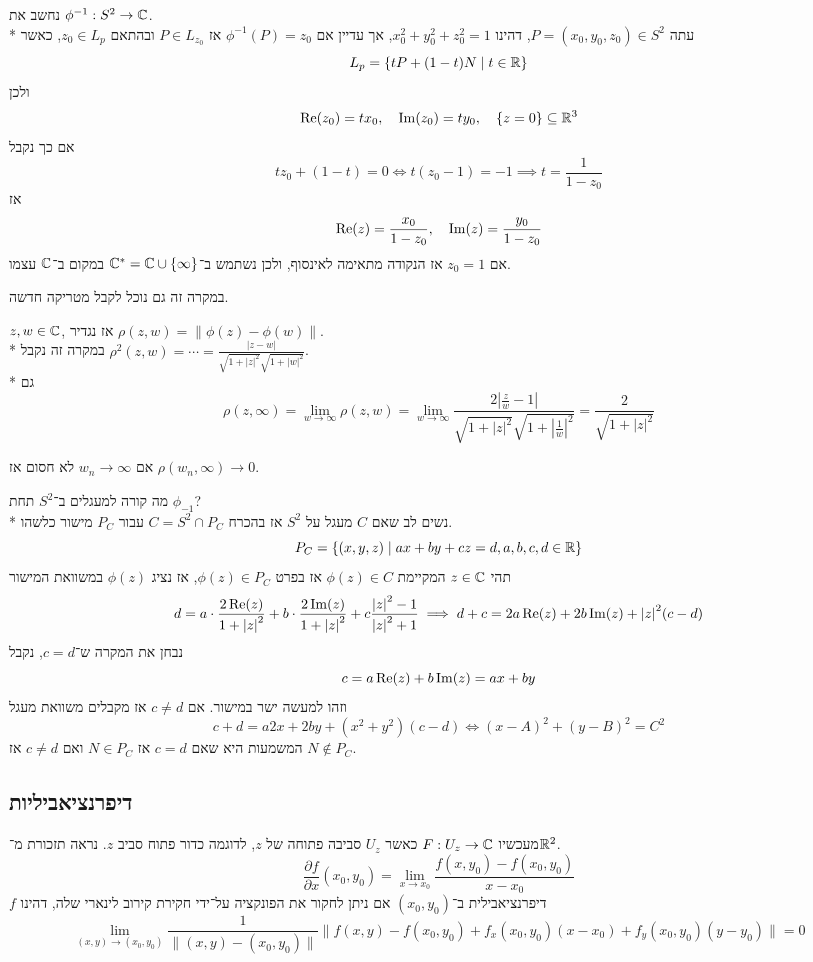 נחשב את $\phi^{-1} : S^2 \to \mathbb{C}$. \\*
עתה $P = (x_0, y_0, z_0) \in S^2$, דהינו $x_0^2 + y_0^2 + z_0^2 = 1$, אך עדיין אם $\phi^{-1}(P) = z_0$ אז $P \in L_{z_0}$ ובהתאם $z_0 \in L_p$, כאשר
\[
	L_p = \{ t P + (1 - t) N \mid t \in \mathbb{R} \}
\]
ולכן
\[
	\operatorname{Re}(z_0) = t x_0,
	\quad \operatorname{Im}(z_0) = t y_0,
	\quad \{ z = 0 \} \subseteq \mathbb{R}^3
\]
אם כך נקבל
\[
	t z_0 + (1 - t) = 0 \iff t(z_0 - 1) = -1 \implies t = \frac{1}{1 - z_0}
\]
אז
\[
	\operatorname{Re}(z) = \frac{x_0}{1 - z_0},
	\quad \operatorname{Im}(z) = \frac{y_0}{1 - z_0}
\]
אם $z_0 = 1$ אז הנקודה מתאימה לאינסוף, ולכן נשתמש ב־$\mathbb{C}^* = \mathbb{C} \cup \{ \infty \}$ במקום ב־$\mathbb{C}$ עצמו.

במקרה זה גם נוכל לקבל מטריקה חדשה.
\begin{definition}
	$z, w \in \mathbb{C}$, אז נגדיר $\rho(z, w) = \lVert \phi(z) - \phi(w) \rVert$. \\*
	במקרה זה נקבל $\rho^2(z, w) = \cdots = \frac{|z - w|}{\sqrt{1 + {|z|}^2} \sqrt{1 + {|w|}^2}}$. \\*
	גם
	\[
		\rho(z, \infty) = \lim_{w \to \infty} \rho(z, w)
		= \lim_{w \to \infty} \frac{2| \frac{z}{w} - 1|}{\sqrt{1 + {|z|}^2} \sqrt{1 + {|\frac{1}{w}|}^2}}
		= \frac{2}{\sqrt{1 + {|z|}^2}}
	\]
\end{definition}
\begin{exercise}
	אם $w_n \to \infty$ לא חסום אז $\rho(w_n, \infty) \to 0$.
\end{exercise}

מה קורה למעגלים ב־$S^2$ תחת $\phi_{-1}$? \\*
נשים לב שאם $C$ מעגל על $S^2$ אז בהכרח $C = S^2 \cap P_C$ עבור $P_C$ מישור כלשהו.
\[
	P_C = \{ (x, y, z) \mid ax + by + cz = d, a, b, c, d \in \mathbb{R} \}
\]
תהי $z \in \mathbb{C}$ המקיימת $\phi(z) \in C$ אז בפרט $\phi(z) \in P_C$, אז נציג $\phi(z)$ במשוואת המישור
\[
	d = a \cdot \frac{2 \operatorname{Re}(z)}{1 + {|z|}^2} + b \cdot \frac{2 \operatorname{Im}(z)}{1 + {|z|}^2} + c \frac{{|z|}^2 - 1}{{|z|}^2 + 1}
	\implies d + c = 2a \operatorname{Re}(z) + 2b \operatorname{Im}(z) + {|z|}^2 (c - d)
\]
נבחן את המקרה ש־$c = d$, נקבל
\[
	c = a \operatorname{Re}(z) + b \operatorname{Im}(z) = ax + by
\]
וזהו למעשה ישר במישור.
אם $c \ne d$ אז מקבלים משוואת מעגל
\[
	c + d = a2 x + 2b y + (x^2 + y^2)(c - d)
	\iff {(x - A)}^2 + {(y - B)}^2 = C^2
\]
המשמעות היא שאם $c = d$ אז $N \in P_C$ ואם $c \ne d$ אז $N \notin P_C$.

\subsection{דיפרנציאביליות}
מעכשיו $F : U_z \to \mathbb{C}$ כאשר $U_z$ סביבה פתוחה של $z$, לדוגמה כדור פתוח סביב $z$.
נראה תזכורת מ־$\mathbb{R}^2$.
\[
	\frac{\partial f}{\partial x}(x_0, y_0) = \lim_{x \to x_0} \frac{f(x, y_0) - f(x_0, y_0)}{x - x_0}
\]
$f$ דיפרנציאבילית ב־$(x_0, y_0)$ אם ניתן לחקור את הפונקציה על־ידי חקירת קירוב לינארי שלה, דהינו
\[
	\lim_{(x, y) \to (x_0, y_0)}  \frac{1}{\lVert (x, y) - (x_0, y_0) \rVert}\lVert f(x, y) - f(x_0, y_0) + f_x(x_0, y_0) (x - x_0) + f_y(x_0, y_0)(y - y_0) \rVert = 0
\]

